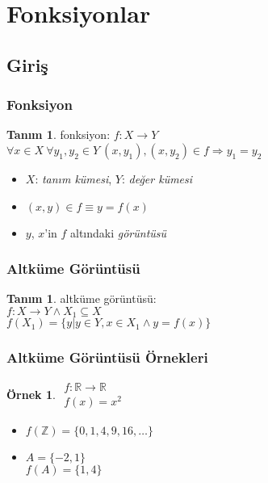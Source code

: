 \documentclass[dvipsnames]{beamer}
\theoremstyle{definition}
\newtheorem{tanim}[theorem]{Tanım}
\theoremstyle{example}
\newtheorem{ornek}[theorem]{Örnek}
\theoremstyle{plain}
\begin{document}
\section{Fonksiyonlar}

\subsection{Giriş}

\begin{frame}
  \frametitle{Fonksiyon}

  \begin{tanim}
    \alert{fonksiyon}: $f: X \rightarrow Y$\\
    $\forall x \in X~\forall y_1,y_2 \in Y~
      (x,y_1),(x,y_2) \in f \Rightarrow y_1=y_2$
  \end{tanim}

  \pause
  \medskip
  \begin{itemize}
    \item $X$: \emph{tanım kümesi}, $Y$: \emph{değer kümesi}

    \pause
    \medskip
    \item $(x,y) \in f \equiv y = f(x)$
    \item $y$, $x$'in $f$ altındaki \emph{görüntüsü}
  \end{itemize}
\end{frame}

\begin{frame}
  \frametitle{Altküme Görüntüsü}

  \begin{tanim}
    \alert{altküme görüntüsü}:\\
    $f: X \rightarrow Y \wedge X_1 \subseteq X$\\
    $f(X_1) = \{ y | y \in Y, x \in X_1 \wedge y = f(x) \}$
  \end{tanim}
\end{frame}

\begin{frame}
  \frametitle{Altküme Görüntüsü Örnekleri}

  \begin{ornek}
    $\begin{array}{l}
      f: \mathbb{R} \rightarrow \mathbb{R}\\
      f(x) = x^2
    \end{array}$

    \pause
    \medskip
    \begin{itemize}
      \item $f(\mathbb{Z}) = \{0,1,4,9,16,\dots\}$

      \pause
      \medskip
      \item $A = \{-2,1\}$\\
        $f(A) = \{1,4\}$
    \end{itemize}
  \end{ornek}
\end{frame}
\end{document}
